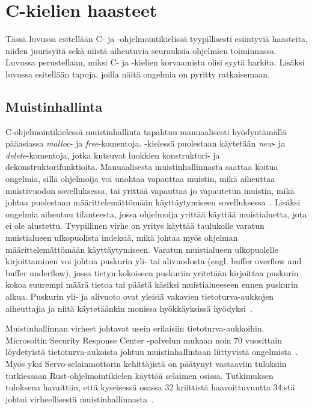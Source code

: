 \chapter{C-kielien haasteet} \label{C-kielien haasteet}
Tässä luvussa esitellään C- ja \Cpp-ohjelmointikielissä tyypillisesti esiintyviä haasteita, niiden juurisyitä sekä niistä aiheutuvia seurauksia ohjelmien toiminnassa. Luvussa perustellaan, miksi C- ja \Cpp-kielien korvaamista olisi syytä harkita. Lisäksi luvussa esitellään tapoja, joilla näitä ongelmia on pyritty ratkaisemaan.

\section{Muistinhallinta}
C-ohjelmointikielessä muistinhallinta tapahtuu manuaalisesti hyödyntämällä pääasiassa \textit{malloc}- ja \textit{free}-komentoja. \Cpp-kielessä puolestaan käytetään \textit{new}- ja \textit{delete}-komentoja, jotka kutsuvat luokkien konstruktori- ja dekonstruktorifunktioita. Manuaalisesta muistinhallinnasta saattaa koitua ongelmia, sillä ohjelmoija voi unohtaa vapauttaa muistin, mikä aiheuttaa muistivuodon sovelluksessa, tai yrittää vapauttaa jo vapautetun muistin, mikä johtaa puolestaan määrittelemättömään käyttäytymiseen sovelluksessa~\cite{cppfree}. Lisäksi ongelmia aiheutuu tilanteesta, jossa ohjelmoija yrittää käyttää muistialuetta, jota ei ole alustettu. Tyypillinen virhe on yritys käyttää taulukolle varatun muistialueen ulkopuolista indeksiä, mikä johtaa myös ohjelman määrittelemättömään käyttäytymiseen. Varatun muistialueen ulkopuolelle kirjoittaminen voi johtua puskurin yli- tai alivuodosta (engl. buffer overflow and buffer underflow), jossa tietyn kokoiseen puskuriin yritetään kirjoittaa puskurin kokoa suurempi määrä tietoa tai päästä käsiksi muistialueeseen ennen puskurin alkua. Puskurin yli- ja alivuoto ovat yleisiä vakavien tietoturva-aukkojen aiheuttajia ja niitä käytetäänkin monissa hyökkäyksissä hyödyksi~\cite{cwetop25}.

Muistinhallinnan virheet johtavat usein erilaisiin tietoturva-aukkoihin. Microsoftin Security Response Center -palvelun mukaan noin 70\text{\%} vuosittain löydetyistä tietoturva-aukoista johtuu muistinhallintaan liittyvistä ongelmista~\cite{microsoftProactiveApproach}. Myös yksi Servo-selainmottorin kehittäjistä on päätynyt vastaaviin tuloksiin tutkiessaan Rust-ohjelmointikielen käyttöä selaimen osissa. Tutkimuksen tuloksena havaittiin, että kyseisessä osassa 32 kriittistä haavoittuvuutta 34:stä johtui virheellisestä muistinhallinnasta~\cite{quantumcss}.


